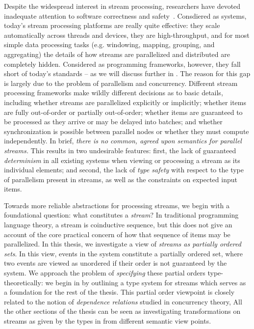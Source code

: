 Despite the widespread interest in stream processing, researchers have devoted inadequate attention to software correctness and safety~.
Consdiered as systems, today's stream processing platforms are really quite effective: they scale automatically across threads and devices, they are high-throughput, and for most simple data processing tasks (e.g. windowing, mapping, grouping, and aggregating) the details of how streams are parallelized and distributed are completely hidden. Considered as programming frameworks, however, they fall short of today's standards -- as we will discuss further in . The reason for this gap is largely due to the problem of parallelism and concurrency. Different stream processing frameworks make wildly different decisions as to basic details, including whether streams are parallelized explicitly or implicitly; whether items are fully out-of-order or partially out-of-order; whether items are guaranteed to be processed as they arrive or may be delayed into batches; and whether synchronization is possible between parallel nodes or whether they must compute independently.
In brief, \emph{there is no common, agreed upon semantics for parallel streams.}
This results in two undesirable features: first, the lack of guaranteed \emph{determinism} in all existing systems when viewing or processing a stream as its individual elements; and second, the lack of \emph{type safety} with respect to the type of parallelism present in streams, as well as the constraints on expected input items.

Towards more reliable abstractions for processing streams, we begin with a foundational question: what constitutes a \emph{stream}?
In traditional programming language theory,
a stream is coinductive sequence, but this does not give an account of the core practical concern of how that sequence of items may be parallelized.
In this thesis, we investigate a view of \emph{streams as partially ordered sets}.
In this view, events in the system constitute a partially ordered set,
where two events are viewed as unordered if their order
is not guaranteed by the system.
We approach the problem of \emph{specifying} these partial orders type-theoretically: we begin in  by
outlining a type system for streams which serves as a foundation for the rest of the thesis.
This partial order viewpoint is closely related to the notion of \emph{dependence relations} studied in concurrency theory,
All the other sections of the thesis can be seen as investigating transformations on streams as given by the types in  from different semantic view points.

